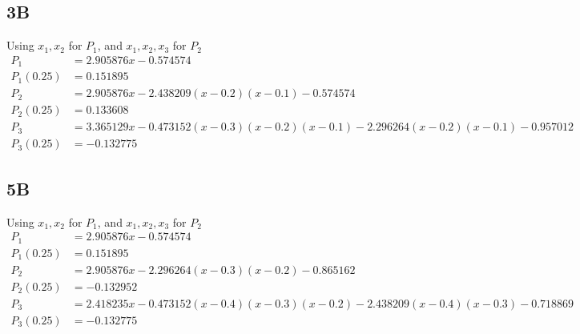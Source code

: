 \documentclass{oisinclass}
\begin{document}
\subsection*{3B}
Using \(x_1, x_2\) for \(P_1\), and \(x_1, x_2, x_3\) for \(P_2\)
\begin{align*}
	P_1       & = 2.905876x-0.574574                                                      \\
	P_1(0.25) & = 0.151895                                                                \\
	P_2       & = 2.905876x-2.438209(x-0.2)(x-0.1)-0.574574                               \\
	P_2(0.25) & = 0.133608                                                                \\
	P_3       & = 3.365129x-0.473152(x-0.3)(x-0.2)(x-0.1)-2.296264(x-0.2)(x-0.1)-0.957012 \\
	P_3(0.25) & = -0.132775
\end{align*}

\subsection*{5B}
Using \(x_1, x_2\) for \(P_1\), and \(x_1, x_2, x_3\) for \(P_2\)
\begin{align*}
	P_1       & = 2.905876 x - 0.574574                                                                                                                                \\
	P_1(0.25) & = 0.151895                                                                                                                                             \\
	P_2       & = 2.905876 x - 2.296264 \left(x - 0.3\right) \left(x - 0.2\right) - 0.865162                                                                           \\
	P_2(0.25) & = -0.132952                                                                                                                                            \\
	P_3       & = 2.418235 x - 0.473152 \left(x - 0.4\right) \left(x - 0.3\right) \left(x - 0.2\right) - 2.438209 \left(x - 0.4\right) \left(x - 0.3\right) - 0.718869 \\
	P_3(0.25) & = -0.132775                                                                                                                                            \\
\end{align*}
\end{document}
